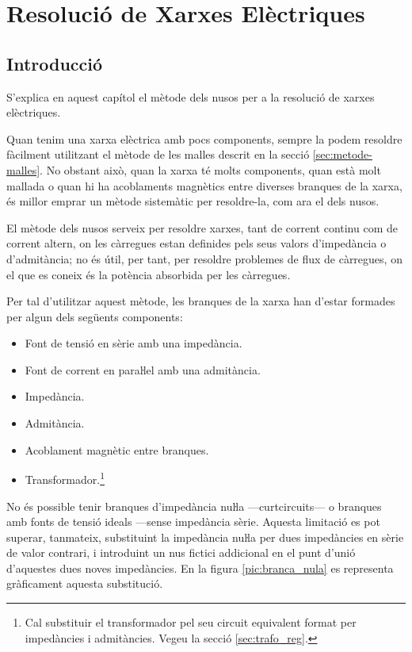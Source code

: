 
\chapter{Resolució de Xarxes Elèctriques} \label{sec:ch-xarxes-elec}
\section{Introducció}\label{sec:ch-xarxes-elec-intro}
S'explica en aquest capítol el
mètode dels nusos per a la resolució de xarxes elèctriques.

Quan tenim una xarxa elèctrica amb pocs components, sempre la podem resoldre fàcilment
utilitzant el mètode de les malles descrit en la secció \vref{sec:metode-malles}. No obstant això, quan la xarxa té molts components, quan està
 molt mallada o quan hi ha acoblaments magnètics entre diverses branques de la xarxa, és millor
 emprar un mètode sistemàtic per  resoldre-la, com ara el  dels nusos.

El mètode dels nusos serveix per resoldre xarxes, tant de corrent
continu com de corrent altern, on les càrregues estan definides pels
seus valors d'impedància o d'admitància; no és útil, per tant, per
resoldre problemes de flux de càrregues, on el que es coneix és la
potència absorbida per les càrregues.

Per tal d'utilitzar aquest mètode, les branques de la xarxa han d'estar
formades per algun dels següents components: \vspace{-1.5mm}
\begin{itemize}
   \item Font de tensió en sèrie amb una impedància.
   \item Font de corrent en paraŀlel amb una admitància.
   \item Impedància.
   \item Admitància.
   \item Acoblament magnètic entre branques.
   \item Transformador.\footnote{Cal substituir el transformador pel seu circuit equivalent format per impedàncies i    admitàncies. Vegeu la secció \ref{sec:trafo_reg}.}
\end{itemize}
\vspace{-1.5mm}

No és possible tenir branques d'impedància nuŀla ---curtcircuits--- o
branques amb fonts de tensió ideals  ---sense impedància sèrie.
Aquesta limitació es pot superar, tanmateix, substituint la
impedància nuŀla per dues impedàncies en sèrie  de valor
contrari, i introduint un nus fictici addicional en el punt d'unió
d'aquestes dues noves impedàncies. En la figura
\vref{pic:branca_nula}
 es representa gràficament aquesta substitució. 
\begin{center}
   
    \label{pic:branca_nula}
\end{center}

